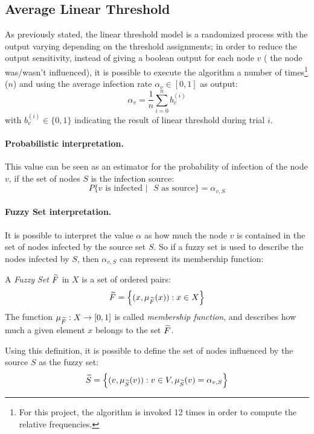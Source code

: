 \subsection{Average Linear Threshold}\label{sec:altm}
As previously stated, the linear threshold model is a randomized process with the output varying depending on the threshold assignments; in order to reduce the output sensitivity, instead of giving a boolean output for each node $v$ (\ie{} the node was/wasn't influenced), it is possible to execute the algorithm a number of times\footnote{For this project, the algorithm is invoked 12 times  in order to compute the relative frequencies.} ($n$) and using the average infection rate $\alpha_v\in[0,1]$ as output:
\begin{equation}
\alpha_v = \frac{1}{n}\sum_{i=0}^{n} b_{v}^{(i)}
\end{equation}
with $b_{v}^{(i)}\in \{0,1\}$ indicating the result of linear threshold during trial $i$.


\paragraph{\textbf{Probabilistic interpretation.}}
This value can be seen as an estimator for the probability of infection of the node $v$, if the set of nodes $S$ is the infection source:
$$P\{\text{$v$ is infected $|$ $S$ as source}\}=\alpha_{v,S}$$

\paragraph{\textbf{Fuzzy Set interpretation.}} It is possible to interpret the value $\alpha$  as  how much the node $v$ is contained in the set of nodes infected by the source set $S$. So if a fuzzy set \cite{fuzzy} is used to describe the nodes infected by $S$, then $\alpha_{v,S}$ can represent its membership function:
\begin{definition}
A \textit{Fuzzy Set} $\widetilde{F}$ in $X$ is a set of ordered pairs:
$$
\widetilde{F} = \left\{(x, \mu_{\widetilde{F}}(x)): x\in X \right\}
$$
The function $\mu_{\widetilde{F}}:X \rightarrow{} [0,1]$ is called \textit{membership function}, and describes how much a given element $x$ belongs to the set $\widetilde{F}$.
\end{definition}
Using this definition, it is possible to define the set of nodes influenced by the source $S$ as the fuzzy set:
$$\widetilde{S} = \Big\{(v, \mu_{\widetilde{S}}(v)): v\in V, \mu_{\widetilde{S}}(v) = \alpha_{v,S}\Big\}$$


